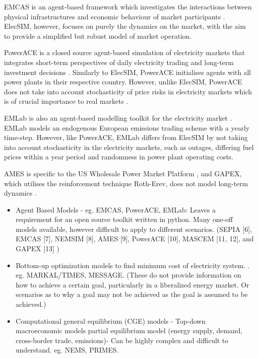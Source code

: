 EMCAS is an agent-based framework which investigates the interactions between physical infrastructures and economic behaviour of market participants \cite{Conzelmann}. ElecSIM, however, focuses on purely the dynamics on the market, with the aim to provide a simplified but robust model of market operation. 

PowerACE is a closed source agent-based simulation of electricity markets that integrates short-term perspectives of daily electricity trading and long-term investment decisions \cite{Rothengatter2007}. Similarly to ElecSIM, PowerACE initialises agents with all power plants in their respective country. However, unlike ElecSIM, PowerACE does not take into account stochasticity of price risks in electricity markets which is of crucial importance to real markets \cite{Most2010}.

EMLab is also an agent-based modelling toolkit for the electricity market \cite{Chappin2017}. EMLab models an endogenous European emissions trading scheme with a yearly time-step. However, like PowerACE, EMLab differs from ElecSIM by not taking into account stochasticity in the electricity markets, such as outages, differing fuel prices within a year period and randomness in power plant operating costs.

AMES is specific to the US Wholesale Power Market Platform \cite{Sun2007}, and GAPEX, which utilises the reinforcement technique Roth-Erev, does not model long-term dynamics \cite{Cincotti2013}. 

\begin{itemize}
	\item Agent Based Models - eg. EMCAS, PowerACE, EMLab: Leaves a requirement for an open source toolkit written in python. Many one-off models available, however difficult to apply to different scenarios.
	(SEPIA [6], EMCAS [7], NEMSIM [8], AMES [9], PowerACE [10], MASCEM [11, 12], and GAPEX [13] \cite{Lopes})
	\item Bottom-up optimization models to find minimum cost of electricity system. \cite{Pfenninger2014}. eg. MARKAL/TIMES, MESSAGE. (These do not provide information on how to achieve a certain goal, particularly in a liberalized energy market. Or scenarios as to why a goal may not be achieved as the goal is assumed to be achieved.)
	\item Computational general equilibrium (CGE) models - Top-down macroeconomic models partial equilibrium model (energy supply, demand, cross-border trade, emissions)- Can be highly complex and difficult to understand. eg. NEMS, PRIMES.
\end{itemize}



